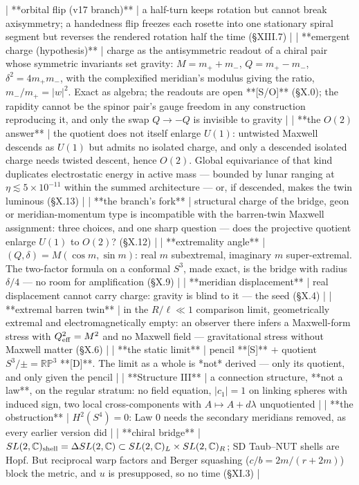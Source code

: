 | **orbital flip (v17 branch)** | a half-turn keeps rotation but cannot break axisymmetry; a handedness flip freezes each rosette into one stationary spiral segment but reverses the rendered rotation half the time (§XIII.7) |
| **emergent charge (hypothesis)** | charge as the antisymmetric readout of a chiral pair whose symmetric invariants set gravity: $M = m_++m_-$, $Q = m_+-m_-$, $\delta^2 = 4m_+m_-$, with the complexified meridian's modulus giving the ratio, $m_-/m_+ = \lvert w\rvert ^2$. Exact as algebra; the readouts are open **[S/O]** (§X.0); the rapidity cannot be the spinor pair's gauge freedom in any construction reproducing it, and only the swap $Q\to-Q$ is invisible to gravity |
| **the $O(2)$ answer** | the quotient does not itself enlarge $U(1)$: untwisted Maxwell descends as $U(1)$ but admits no isolated charge, and only a descended isolated charge needs twisted descent, hence $O(2)$. Global equivariance of that kind duplicates electrostatic energy in active mass — bounded by lunar ranging at $\eta\lesssim5\times10^{-11}$ within the summed architecture — or, if descended, makes the twin luminous (§X.13) |
| **the branch's fork** | structural charge of the bridge, geon or meridian-momentum type is incompatible with the barren-twin Maxwell assignment: three choices, and one sharp question — does the projective quotient enlarge $U(1)$ to $O(2)$? (§X.12) |
| **extremality angle** | $(Q,\delta) = M(\cos m,\sin m)$: real $m$ subextremal, imaginary $m$ super-extremal. The two-factor formula on a conformal $S^3$, made exact, is the bridge with radius $\delta/4$ — no room for amplification (§X.9) |
| **meridian displacement** | real displacement cannot carry charge: gravity is blind to it — the seed (§X.4) |
| **extremal barren twin** | in the $R/\ell\ll1$ comparison limit, geometrically extremal and electromagnetically empty: an observer there infers a Maxwell-form stress with $Q_{\rm eff}^2 = M^2$ and no Maxwell field — gravitational stress without Maxwell matter (§X.6) |
| **the static limit** | pencil **[S]** $+$ quotient $S^3/\pm = \mathbb{RP}^3$ **[D]**. The limit as a whole is *not* derived — only its quotient, and only given the pencil |
| **Structure III** | a connection structure, **not a law**, on the regular stratum: no field equation, $\lvert c_1\rvert  = 1$ on linking spheres with induced sign, two local cross-components with $A\mapsto A+d\lambda$ unquotiented |
| **the obstruction** | $H^2(S^4) = 0$: Law 0 needs the secondary meridians removed, as every earlier version did |
| **chiral bridge** | $SL(2,\mathbb{C})_{\rm shell} = \Delta SL(2,\mathbb{C})\subset SL(2,\mathbb{C})_L\times SL(2,\mathbb{C})_R$; SD Taub–NUT shells are Hopf. But reciprocal warp factors and Berger squashing ($c/b = 2m/(r+2m)$) block the metric, and $u$ is presupposed, so no time (§XI.3) |
